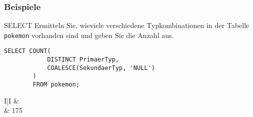 \subsubsection{Beispiele}

\begin{example}{SELECT}
    Ermitteln Sie, wieviele verschiedene Typkombinationen in der Tabelle \texttt{pokemon} vorhanden sind und geben Sie die Anzahl aus.

    \exampleseparator

    \begin{lstlisting}[language=mysql]
        SELECT COUNT(
            DISTINCT PrimaerTyp,
            COALESCE(SekundaerTyp, 'NULL')
        )
        FROM pokemon;
    \end{lstlisting}

    \setcounter{rownum}{0}
    \begin{tabular}{I|I}
          &  \\ & 175                                                                            \\
    \end{tabular}
\end{example}

